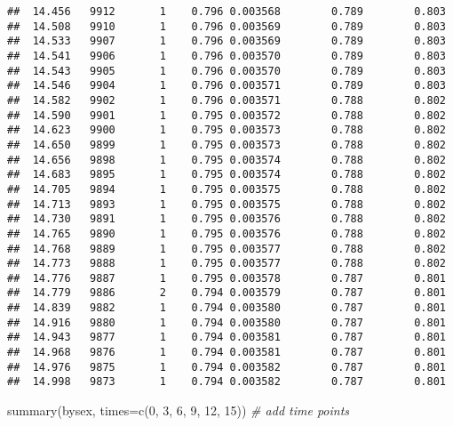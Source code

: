 \documentclass[
]{book}
\newenvironment{Shaded}{\begin{snugshade}}{\end{snugshade}}
\newcommand{\AttributeTok}[1]{\textcolor[rgb]{0.77,0.63,0.00}{#1}}
\newcommand{\CommentTok}[1]{\textcolor[rgb]{0.56,0.35,0.01}{\textit{#1}}}
\newcommand{\DecValTok}[1]{\textcolor[rgb]{0.00,0.00,0.81}{#1}}
\newcommand{\FunctionTok}[1]{\textcolor[rgb]{0.00,0.00,0.00}{#1}}
\newcommand{\NormalTok}[1]{#1}
\begin{document}
\begin{verbatim}
##  14.456   9912       1    0.796 0.003568        0.789        0.803
##  14.508   9910       1    0.796 0.003569        0.789        0.803
##  14.533   9907       1    0.796 0.003569        0.789        0.803
##  14.541   9906       1    0.796 0.003570        0.789        0.803
##  14.543   9905       1    0.796 0.003570        0.789        0.803
##  14.546   9904       1    0.796 0.003571        0.789        0.803
##  14.582   9902       1    0.796 0.003571        0.788        0.802
##  14.590   9901       1    0.795 0.003572        0.788        0.802
##  14.623   9900       1    0.795 0.003573        0.788        0.802
##  14.650   9899       1    0.795 0.003573        0.788        0.802
##  14.656   9898       1    0.795 0.003574        0.788        0.802
##  14.683   9895       1    0.795 0.003574        0.788        0.802
##  14.705   9894       1    0.795 0.003575        0.788        0.802
##  14.713   9893       1    0.795 0.003575        0.788        0.802
##  14.730   9891       1    0.795 0.003576        0.788        0.802
##  14.765   9890       1    0.795 0.003576        0.788        0.802
##  14.768   9889       1    0.795 0.003577        0.788        0.802
##  14.773   9888       1    0.795 0.003577        0.788        0.802
##  14.776   9887       1    0.795 0.003578        0.787        0.801
##  14.779   9886       2    0.794 0.003579        0.787        0.801
##  14.839   9882       1    0.794 0.003580        0.787        0.801
##  14.916   9880       1    0.794 0.003580        0.787        0.801
##  14.943   9877       1    0.794 0.003581        0.787        0.801
##  14.968   9876       1    0.794 0.003581        0.787        0.801
##  14.976   9875       1    0.794 0.003582        0.787        0.801
##  14.998   9873       1    0.794 0.003582        0.787        0.801
\end{verbatim}

\begin{Shaded}
\begin{Highlighting}[]
\FunctionTok{summary}\NormalTok{(bysex, }\AttributeTok{times=}\FunctionTok{c}\NormalTok{(}\DecValTok{0}\NormalTok{, }\DecValTok{3}\NormalTok{, }\DecValTok{6}\NormalTok{, }\DecValTok{9}\NormalTok{, }\DecValTok{12}\NormalTok{, }\DecValTok{15}\NormalTok{)) }\CommentTok{\# add time points}
\end{Highlighting}
\end{Shaded}
\end{document}
